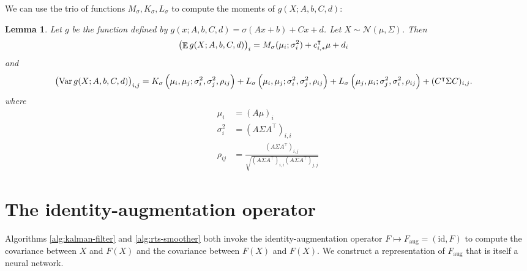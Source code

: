 \documentclass[oneside, article]{memoir}
\newtheorem{lemma}{Lemma}
\DeclareMathOperator{\expect}{\mathbb{E}}
\DeclareMathOperator{\Var}{\operatorname{Var}}
\begin{document}
We can use the trio of functions \(M_\sigma, K_\sigma, L_\sigma\) to
compute the moments of \(g(X; A, b, C, d)\):
\begin{lemma}
  Let \(g\) be the function defined by \(g(x; A, b, C, d) = \sigma(A
  x+ b) + C x + d\).
  Let \(X \sim \mathcal N(\mu, \Sigma)\).
  Then
  \begin{align*}
    \del{\expect g(X; A, b, C, d)}_i &= M_\sigma(\mu_i; \sigma_i^2) +
    c_{i, *}^\intercal \mu + d_i
  \end{align*}
  and
  \begin{align*}
    \del{\Var g(X; A, b, C, d)}_{i, j}
    &= K_\sigma\del{
      \mu_i, \mu_j; \sigma_i^2, \sigma_j^2, \rho_{ij}
    }
    + L_\sigma\del{
      \mu_i, \mu_j; \sigma_i^2, \sigma_j^2, \rho_{ij}
    }
    + L_\sigma\del{
      \mu_j, \mu_i; \sigma_j^2, \sigma_i^2, \rho_{ij}
    }
    + (C^\intercal \Sigma C)_{i, j}.
  \end{align*}
  where
  \begin{align*}
    \mu_i &= (A\mu)_i
    \\
    \sigma_i^2 &= (A\Sigma A^\intercal)_{i,i}
    \\
    \rho_{ij} &= \frac{(A\Sigma A^\intercal)_{i,j}}{\sqrt{(A\Sigma
    A^\intercal)_{i,i} (A\Sigma A^\intercal)_{j,j}}}
  \end{align*}
\end{lemma}

\section{The identity-augmentation operator}
Algorithms \ref{alg:kalman-filter} and \ref{alg:rts-smoother}
both invoke the identity-augmentation operator \(F \mapsto F_\text{aug}=(\text{id}, F)\) to compute the covariance between \(X\) and \(F(X)\) and the covariance between \(F(X)\) and \(F(X)\).
We construct a representation of \(F_\text{aug}\) that is itself a neural network.
\end{document}
